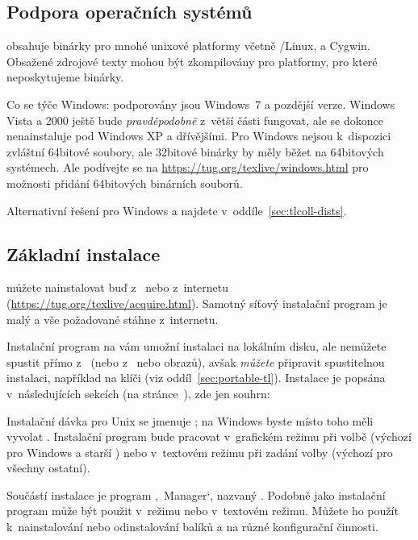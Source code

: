 \documentclass[\classoptions,slovak,english,czech]{\classname}
\newcommand{\singleuv}[1]{,#1`}
\begin{document}
\subsection{Podpora operačních systémů}
\label{sec:os-support}

\TL{} obsahuje binárky pro mnohé unixové platformy
včetně \GNU/Linux, \MacOSX a Cygwin. 
Obsažené zdrojové texty mohou být zkompilovány
pro platformy, pro které neposkytujeme binárky.

Co se týče Windows: podporovány jsou Windows~7 a pozdější verze.
Windows Vista a 2000 ještě bude \emph{pravděpodobně} z~větší části fungovat,
ale \TL{} se dokonce nenainstaluje pod Windows XP a dřívějšími. 
Pro Windows nejsou k~dispozici zvláštní 64bitové  soubory, ale
32bitové binárky by měly běžet na 64bitových systémech. Ale podívejte se na
\url{https://tug.org/texlive/windows.html} pro možnosti přidání
64bitových binárních souborů. 
			
Alternativní řešení pro Windows a \MacOSX{} najdete 
v~oddíle~\ref{sec:tlcoll-dists}.

\subsection{Základní instalace \protect\TL{}}
\label{sec:basic}

\TL{} můžete nainstalovat buď z~\DVD{} nebo z~internetu 
(\url{https://tug.org/texlive/acquire.html}). Samotný síťový
instalační program je malý a vše požadované stáhne z~internetu. 

Instalační program na \DVD{} vám umožní instalaci na lokálním 
disku, ale \TL{} nemůžete spustit přímo z~\TK{} \DVD{} 
(nebo z~\TK{} nebo \TL{}  obrazů), avšak \emph{můžete} připravit
spustitelnou instalaci, například na klíči \USB{} (viz
oddíl~\ref{sec:portable-tl}). Instalace je popsána v~následujících 
sekcích (na stránce~\pageref{sec:install}), zde jen souhrn:
\begin{itemize*}
\item Instalační dávka pro Unix se jmenuje ; na
Windows byste místo toho měli vyvolat .
Instalační program bude pracovat v~grafickém režimu při volbě 
 (výchozí pro Windows a starší \MacOSX) nebo v~textovém režimu
při zadání volby  (výchozí pro všechny ostatní). 

\item Součástí instalace je program
\singleuv{\TL\ Manager}, nazvaný .
Podobně jako instalační program může být použit 
v~režimu \GUI{} nebo v~textovém režimu. 
Můžete ho použít k~nainstalování nebo odinstalování 
balíků a na různé konfigurační činnosti.
\end{itemize*}
\end{document}
